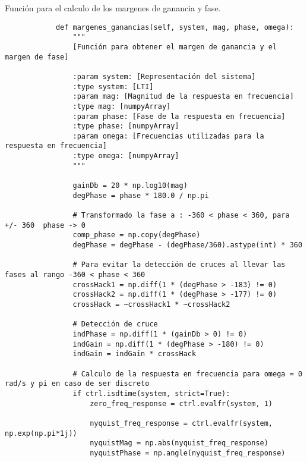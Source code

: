 
    \begin{longlisting}
        \caption[Calculo de los margenes de ganancia y fase]{Función para el calculo de los margenes de ganancia y fase.}
        \label{code:anexoA}				
        \begin{verbatim}
            def margenes_ganancias(self, system, mag, phase, omega):
                """
                [Función para obtener el margen de ganancia y el margen de fase]
                
                :param system: [Representación del sistema]
                :type system: [LTI]
                :param mag: [Magnitud de la respuesta en frecuencia]
                :type mag: [numpyArray]
                :param phase: [Fase de la respuesta en frecuencia]
                :type phase: [numpyArray]
                :param omega: [Frecuencias utilizadas para la respuesta en frecuencia]
                :type omega: [numpyArray]
                """

                gainDb = 20 * np.log10(mag)
                degPhase = phase * 180.0 / np.pi

                # Transformado la fase a : -360 < phase < 360, para +/- 360  phase -> 0
                comp_phase = np.copy(degPhase)
                degPhase = degPhase - (degPhase/360).astype(int) * 360

                # Para evitar la detección de cruces al llevar las fases al rango -360 < phase < 360
                crossHack1 = np.diff(1 * (degPhase > -183) != 0)
                crossHack2 = np.diff(1 * (degPhase > -177) != 0)
                crossHack = ~crossHack1 * ~crossHack2

                # Detección de cruce
                indPhase = np.diff(1 * (gainDb > 0) != 0)
                indGain = np.diff(1 * (degPhase > -180) != 0)
                indGain = indGain * crossHack

                # Calculo de la respuesta en frecuencia para omega = 0 rad/s y pi en caso de ser discreto
                if ctrl.isdtime(system, strict=True):
                    zero_freq_response = ctrl.evalfr(system, 1)
                    
                    nyquist_freq_response = ctrl.evalfr(system, np.exp(np.pi*1j))
                    nyquistMag = np.abs(nyquist_freq_response)
                    nyquistPhase = np.angle(nyquist_freq_response)
                    

\end{verbatim}
\end{longlisting}
